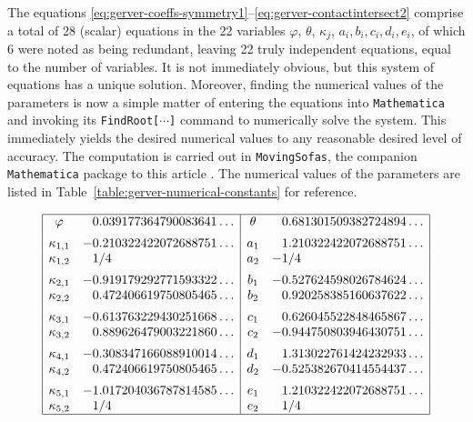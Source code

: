 \documentclass[11pt]{article}
\begin{document}
The equations 
\eqref{eq:gerver-coeffs-symmetry1}--\eqref{eq:gerver-contactintersect2} 
comprise a total of 28 (scalar) equations in the 22 variables $\varphi$, $\theta$, $\kappa_j$, $a_i,b_i,c_i,d_i,e_i$, of which 6 were noted as being redundant, leaving 22 truly independent equations, equal to the number of variables. It is not immediately obvious, but this system of equations has a unique solution. Moreover, finding the numerical values of the parameters is now a simple matter of entering the equations into \texttt{Mathematica} and invoking its \texttt{FindRoot[$\cdots$]} command to numerically solve the system. This immediately yields the desired numerical values to any reasonable desired level of accuracy. The computation is carried out in \texttt{MovingSofas}, the companion \texttt{Mathematica} package to this article \cite[Section~6]{romik-sofa-mathematica}. The numerical values of the parameters are listed in Table~\ref{table:gerver-numerical-constants} for reference.

\begin{table}
$$
\begin{array}{|cl|cl|} \hline
\varphi & \phantom{-}0.039 177 364 790 083 641\ldots & 
\theta & \phantom{-}0.681 301 509 382 724 894\ldots 
\\[5pt]
\kappa_{1,1} & -0.210 322 422 072 688 751 \ldots & a_1 & \phantom{-}1.210 322 422 072 688 751\ldots
\\
\kappa_{1,2} & \phantom{-}1/4  & a_2 & -1/4
\\[5pt]
\kappa_{2,1} & -0.919 179 292 771 593 322 \ldots & b_1 & -0.527 624 598 026 784 624\ldots
\\
\kappa_{2,2} & \phantom{-}0.472 406 619 750 805 465 \ldots & b_2 & \phantom{-}0.920 258 385 160 637 622\ldots
\\[5pt]
\kappa_{3,1} & -0.613 763 229 430 251 668\ldots & c_1 & \phantom{-}0.626 045 522 848 465 867\ldots
\\
\kappa_{3,2} & \phantom{-}0.889 626 479 003 221 860\ldots & c_2 & -0.944 750 803 946 430 751\ldots
\\[5pt]
\kappa_{4,1} & -0.308 347 166 088 910 014\ldots & d_1 & \phantom{-}1.313 022 761 424 232 933\ldots
\\
\kappa_{4,2} & \phantom{-}0.472 406 619 750 805 465\ldots & d_2 & -0.525 382 670 414 554 437\ldots
\\[5pt]
\kappa_{5,1} & -1.017 204 036 787 814 585\ldots & e_1 & \phantom{-}1.210 322 422 072 688 751\ldots
\\
\kappa_{5,2} & \phantom{-}1/4 & e_2 & \phantom{-}1/4
\\ \hline 
\end{array}
$$
\caption{Numerical values for the constants in Gerver's sofa.}
\label{table:gerver-numerical-constants}
\end{table}
\end{document}
